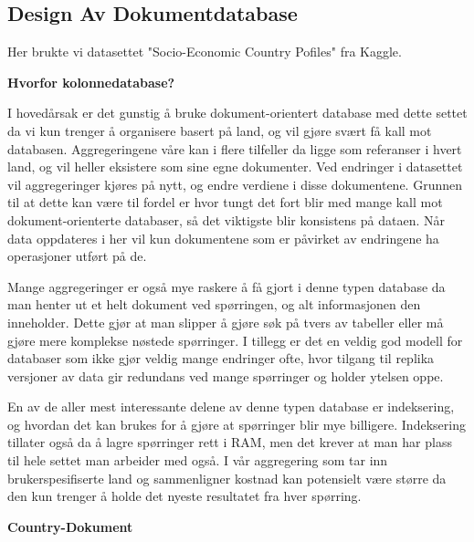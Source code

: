 \subsection{Design Av Dokumentdatabase}
Her brukte vi datasettet "Socio-Economic Country Pofiles" fra Kaggle.

\textbf{Hvorfor kolonnedatabase?}

I hovedårsak er det gunstig å bruke dokument-orientert database med dette settet da vi kun trenger å organisere basert på land, og vil gjøre svært få kall mot databasen. Aggregeringene våre kan i flere tilfeller da ligge som referanser i hvert land, og vil heller eksistere som sine egne dokumenter. Ved endringer i datasettet vil aggregeringer kjøres på nytt, og endre verdiene i disse dokumentene. Grunnen til at dette kan være til fordel er hvor tungt det fort blir med mange kall mot dokument-orienterte databaser, så det viktigste blir konsistens på dataen. Når data oppdateres i her vil kun dokumentene som er påvirket av endringene ha operasjoner utført på de.

Mange aggregeringer er også mye raskere å få gjort i denne typen database da man henter ut et helt dokument ved spørringen, og alt informasjonen den inneholder. Dette gjør at man slipper å gjøre søk på tvers av tabeller eller må gjøre mere komplekse nøstede spørringer. I tillegg er det en veldig god modell for databaser som ikke gjør veldig mange endringer ofte, hvor tilgang til replika versjoner av data gir redundans ved mange spørringer og holder ytelsen oppe.

En av de aller mest interessante delene av denne typen database er indeksering, og hvordan det kan brukes for å gjøre at spørringer blir mye billigere. Indeksering tillater også da å lagre spørringer rett i RAM, men det krever at man har plass til hele settet man arbeider med også. I vår aggregering som tar inn brukerspesifiserte land og sammenligner kostnad kan potensielt være større da den kun trenger å holde det nyeste resultatet fra hver spørring.

\textbf{Country-Dokument}


